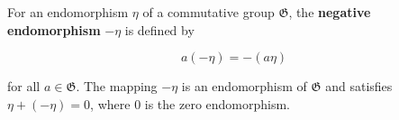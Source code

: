 For an endomorphism $\eta$ of a commutative group $\mathfrak{G}$, the \textbf{negative endomorphism} $-\eta$ is defined by

$$a(-\eta) = -(a\eta)$$

for all $a \in \mathfrak{G}$. The mapping $-\eta$ is an endomorphism of $\mathfrak{G}$ and satisfies $\eta + (-\eta) = 0$, where $0$ is the zero endomorphism.
